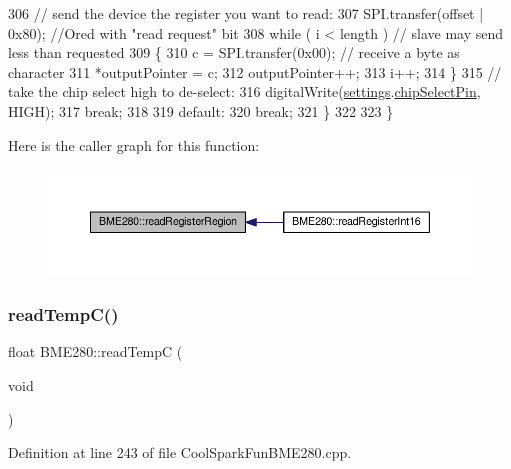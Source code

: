 \begin{DoxyCode}
306         \textcolor{comment}{// send the device the register you want to read:}
307         SPI.transfer(offset | 0x80);  \textcolor{comment}{//Ored with "read request" bit}
308         \textcolor{keywordflow}{while} ( i < length ) \textcolor{comment}{// slave may send less than requested}
309         \{
310             c = SPI.transfer(0x00); \textcolor{comment}{// receive a byte as character}
311             *outputPointer = c;
312             outputPointer++;
313             i++;
314         \}
315         \textcolor{comment}{// take the chip select high to de-select:}
316         digitalWrite(\hyperlink{class_b_m_e280_af06253eb2f8ad4b5fabb858bc4a973bf}{settings}.\hyperlink{struct_sensor_settings_abe2de606ebb580ad81e3fafb1a454580}{chipSelectPin}, HIGH);
317         \textcolor{keywordflow}{break};
318 
319     \textcolor{keywordflow}{default}:
320         \textcolor{keywordflow}{break};
321     \}
322 
323 \}
\end{DoxyCode}
Here is the caller graph for this function\+:\nopagebreak
\begin{figure}[H]
\begin{center}
\leavevmode
\includegraphics[width=350pt]{df/dcf/class_b_m_e280_aecca87c2c40a7f2bcabcea921bdc6124_icgraph}
\end{center}
\end{figure}
\mbox{\label{class_b_m_e280_afffdd1d7ded9e1f92200e70669019d97}} 
\subsubsection{\texorpdfstring{read\+Temp\+C()}{readTempC()}}
{\footnotesize\ttfamily float B\+M\+E280\+::read\+TempC (\begin{DoxyParamCaption}\item[{void}]{ }\end{DoxyParamCaption})}



Definition at line 243 of file Cool\+Spark\+Fun\+B\+M\+E280.\+cpp.


